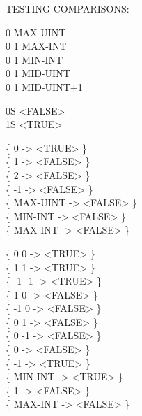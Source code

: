 \begin{tt}
TESTING COMPARISONS:  \word{=}      

0  				\tab[7.9]		 MAX-UINT \\
0  1  \tab[3.15]		 MAX-INT \\
0  1  	 MIN-INT \\
0  1  \tab[3.15]		 MID-UINT \\
0  1  	 MID-UINT+1

0S  <FALSE> \\
1S  <TRUE>

\{  0  -> <TRUE>  \} \\
\{  1  -> <FALSE> \} \\
\{  2  -> <FALSE> \} \\
\{ -1  -> <FALSE> \} \\
\{ MAX-UINT  -> <FALSE> \} \\
\{ MIN-INT   -> <FALSE> \} \\
\{ MAX-INT   -> <FALSE> \}

\{  0  0 \word{=} -> <TRUE>  \} \\
\{  1  1 \word{=} -> <TRUE>  \} \\
\{ -1 -1 \word{=} -> <TRUE>  \} \\
\{  1  0 \word{=} -> <FALSE> \} \\
\{ -1  0 \word{=} -> <FALSE> \} \\
\{  0  1 \word{=} -> <FALSE> \} \\
\{  0 -1 \word{=} -> <FALSE> \} \\

\{       0  -> <FALSE> \} \\
\{      -1  -> <TRUE>  \} \\
\{ MIN-INT  -> <TRUE>  \} \\
\{       1  -> <FALSE> \} \\
\{ MAX-INT  -> <FALSE> \}


\end{tt}
